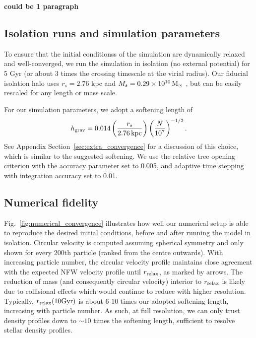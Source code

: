 \textbf{could be 1 paragraph}

\subsection{Isolation runs and simulation
parameters}\label{isolation-runs-and-simulation-parameters}

To ensure that the initial conditionss of the simulation are dynamically
relaxed and well-converged, we run the simulation in isolation (no
external potential) for 5 Gyr (or about 3 times the crossing timescale
at the virial radius). Our fiducial isolation halo uses \(r_s=2.76\) kpc
and \(M_s = 0.29 \times 10^{10}\,{\rm M}_{\odot}\) , but can be easily rescaled for
any length or mass scale.

For our simulation parameters, we adopt a softening length of
\begin{equation}{
h_{\rm grav} = 0.014 \left(\frac{r_s}{2.76\,{\rm kpc}}\right)\left(\frac{N}{10^7}\right)^{-1/2}.
}\end{equation} See Appendix Section~\ref{sec:extra_convergence} for a
discussion of this choice, which is similar to the \citet{power+2003}
suggested softening. We use the relative tree opening criterion with the
accuracy parameter set to 0.005, and adaptive time stepping with
integration accuracy set to 0.01.

\subsection{Numerical fidelity}\label{numerical-fidelity}

Fig.~\ref{fig:numerical_convergence} illustrates how well our numerical
setup is able to reproduce the desired initial conditions, before and
after running the model in isolation. Circular velocity is computed
assuming spherical symmetry and only shown for every 200th particle
(ranked from the centre outwards). With increasing particle number, the
circular velocity profile maintains close agreement with the expected
NFW velocity profile until \(r_{\rm relax}\), as marked by arrows. The
reduction of mass (and consequently circular velocity) interior to
\(r_{\rm relax}\) is likely due to collisional effects which would
continue to reduce with higher resolution. Typically,
\(r_{\rm relax}(10{\rm Gyr})\) is about 6-10 times our adopted softening
length, increasing with particle number. As such, at full resolution, we
can only trust density profiles down to \(\sim10\) times the softening
length, sufficient to resolve stellar density profiles.

